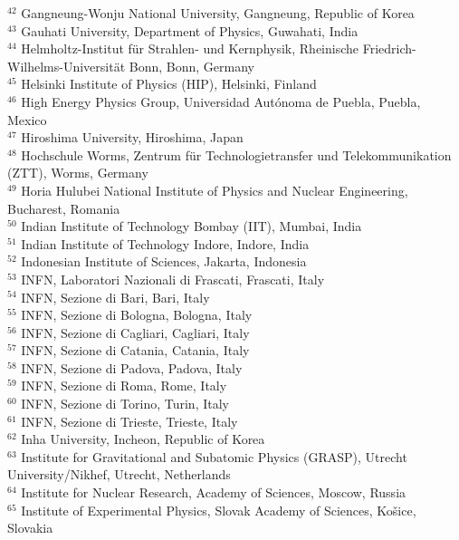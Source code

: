 \begin{flushleft}
$^{42}$ Gangneung-Wonju National University, Gangneung, Republic of Korea\\
$^{43}$ Gauhati University, Department of Physics, Guwahati, India\\
$^{44}$ Helmholtz-Institut f\"{u}r Strahlen- und Kernphysik, Rheinische Friedrich-Wilhelms-Universit\"{a}t Bonn, Bonn, Germany\\
$^{45}$ Helsinki Institute of Physics (HIP), Helsinki, Finland\\
$^{46}$ High Energy Physics Group,  Universidad Aut\'{o}noma de Puebla, Puebla, Mexico\\
$^{47}$ Hiroshima University, Hiroshima, Japan\\
$^{48}$ Hochschule Worms, Zentrum  f\"{u}r Technologietransfer und Telekommunikation (ZTT), Worms, Germany\\
$^{49}$ Horia Hulubei National Institute of Physics and Nuclear Engineering, Bucharest, Romania\\
$^{50}$ Indian Institute of Technology Bombay (IIT), Mumbai, India\\
$^{51}$ Indian Institute of Technology Indore, Indore, India\\
$^{52}$ Indonesian Institute of Sciences, Jakarta, Indonesia\\
$^{53}$ INFN, Laboratori Nazionali di Frascati, Frascati, Italy\\
$^{54}$ INFN, Sezione di Bari, Bari, Italy\\
$^{55}$ INFN, Sezione di Bologna, Bologna, Italy\\
$^{56}$ INFN, Sezione di Cagliari, Cagliari, Italy\\
$^{57}$ INFN, Sezione di Catania, Catania, Italy\\
$^{58}$ INFN, Sezione di Padova, Padova, Italy\\
$^{59}$ INFN, Sezione di Roma, Rome, Italy\\
$^{60}$ INFN, Sezione di Torino, Turin, Italy\\
$^{61}$ INFN, Sezione di Trieste, Trieste, Italy\\
$^{62}$ Inha University, Incheon, Republic of Korea\\
$^{63}$ Institute for Gravitational and Subatomic Physics (GRASP), Utrecht University/Nikhef, Utrecht, Netherlands\\
$^{64}$ Institute for Nuclear Research, Academy of Sciences, Moscow, Russia\\
$^{65}$ Institute of Experimental Physics, Slovak Academy of Sciences, Ko\v{s}ice, Slovakia\\

\end{flushleft}
